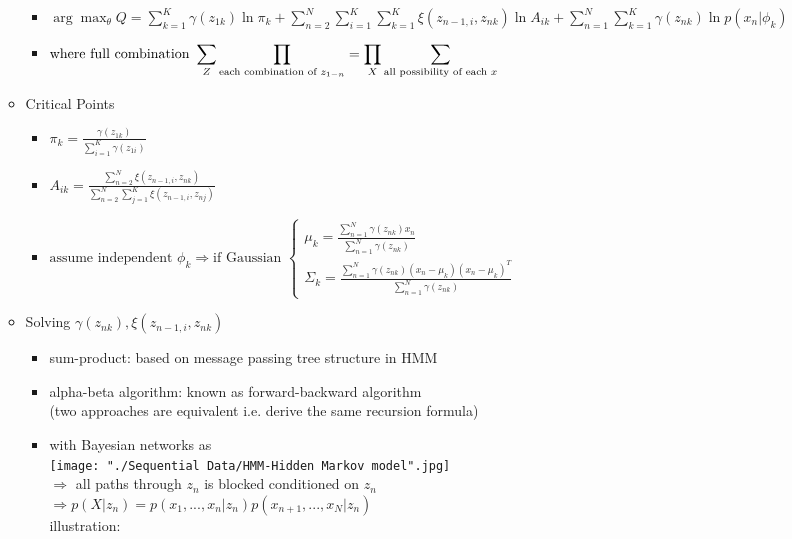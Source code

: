 \begin{itemize}
\begin{itemize}
\begin{itemize}
		\item $\displaystyle \arg\max_{\theta}Q = \sum_{k=1}^K \gamma(z_{1k})\ln \pi_k + \sum_{n=2}^N\sum_{i=1}^K\sum_{k=1}^K \xi(z_{n-1,i},z_{nk})\ln A_{ik} + \sum_{n=1}^N \sum_{k=1}^K \gamma(z_{nk}) \ln p(x_n|\phi_k)$
		\item $\displaystyle \text{where full combination } \small \sum_{Z}\prod_{\text{each combination of }z_{1-n}} = \prod_{X}\sum_{\text{all possibility of each }x}$
		\end{itemize}
	\item Critical Points
		\begin{itemize}
		\item $\displaystyle \pi_k = \frac {\gamma(z_{1k})} {\displaystyle \sum_{i=1}^K \gamma(z_{1i})}$
		\item $\displaystyle A_{ik} = \frac {\sum_{n=2}^N \xi(z_{n-1,i},z_{nk})} {\sum_{n=2}^N \sum_{j=1}^K \xi(z_{n-1,i},z_{nj})}$
		\item $\text{assume independent } \phi_k \Rightarrow \text{if Gaussian } \begin{cases} \displaystyle \mu_k = \frac {\sum_{n=1}^N \gamma(z_{nk})x_n}{\sum_{n=1}^N \gamma(z_{nk})} \\ \displaystyle \Sigma_k = \frac{\sum_{n=1}^N \gamma(z_{nk}) (x_n-\mu_k)(x_n-\mu_k)^T}{\sum_{n=1}^N \gamma(z_{nk})} \end{cases}$
		\end{itemize}
	\item Solving $\gamma(z_{nk}),\xi(z_{n-1,i}, z_{nk})$
		\begin{itemize}
		\item sum-product: based on message passing tree structure in HMM
		\item alpha-beta algorithm: known as forward-backward algorithm \\
		(two approaches are equivalent i.e. derive the same recursion formula)
		\item with Bayesian networks as \\
		\texttt{[image: "./Sequential Data/HMM-Hidden Markov model".jpg]} \\
		$\Rightarrow$ all paths through $z_n$ is blocked conditioned on $z_n$ \\
		$\Rightarrow p(X|z_n) = p(x_1,...,x_n|z_n)p(x_{n+1},...,x_N|z_n)$ \\
		illustration: \\
		\begin{figure}[h]
			\begin{minipage}{0.5\linewidth}

\end{minipage}
\end{figure}
\end{itemize}
\end{itemize}
\end{itemize}
